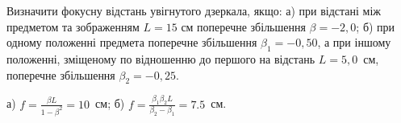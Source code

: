 \begin{problem}%
Визначити фокусну відстань увігнутого дзеркала, якщо: а) при відстані між предметом та зображенням $L = 15$ см поперечне збільшення $ \beta = -2,0 $; б) при одному положенні предмета поперечне збільшення $ \beta_1 = -0,50 $, а при іншому положенні, зміщеному по відношенню до першого на відстань $L=5,0$~см, поперечне збільшення $ \beta_2 = -0,25 $.
\begin{solution}
	а) $f = \frac{\beta L}{1 - \beta^2} = 10$~см; б) $f = \frac{\beta_1\beta_2 L}{\beta_2 - \beta_1} = 7.5$~см.
\end{solution}
\end{problem}




